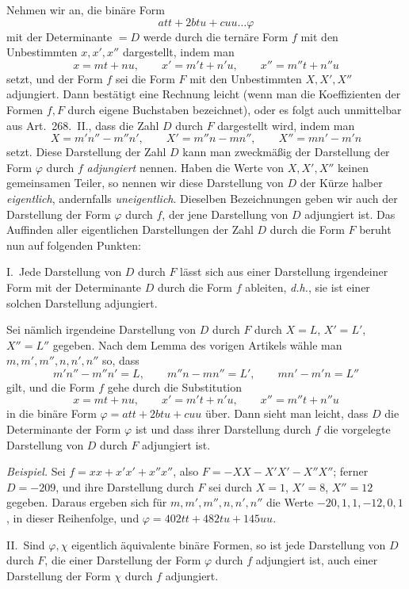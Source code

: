 Nehmen wir an, die binäre Form
\[
att+2btu+cuu\ldots\varphi
\]
mit der Determinante $=D$ werde durch die ternäre Form $f$ mit den
Unbestimmten $x,x',x''$ dargestellt, indem man
\[
x=mt+nu,\qquad x'=m't+n'u,\qquad x''=m''t+n''u
\]
setzt, und der Form $f$ sei die Form $F$ mit den Unbestimmten $X,X',X''$
adjungiert. Dann bestätigt eine Rechnung leicht (wenn man die Koeffizienten
der Formen $f,F$ durch eigene Buchstaben bezeichnet), oder es folgt auch
unmittelbar aus Art.\ 268.\ II., dass die Zahl $D$ durch $F$
dargestellt wird, indem man
\[
X=m'n''-m''n',\qquad X'=m''n-mn'',\qquad X''=mn'-m'n
\]
setzt. Diese Darstellung der Zahl $D$ kann man zweckmäßig der Darstellung
der Form $\varphi$ durch $f$ \textit{adjungiert} nennen. Haben die Werte
von $X,X',X''$ keinen gemeinsamen Teiler, so nennen wir diese Darstellung
von $D$ der Kürze halber \textit{eigentlich}, andernfalls \textit{uneigentlich}.
Dieselben Bezeichnungen geben wir auch der Darstellung der Form $\varphi$
durch $f$, der jene Darstellung von $D$ adjungiert ist. Das Auffinden
aller eigentlichen Darstellungen der Zahl $D$ durch die Form $F$
beruht nun auf folgenden Punkten:

I.\ Jede Darstellung von $D$ durch $F$ lässt sich aus einer
Darstellung irgendeiner Form mit der Determinante $D$ durch die Form
$f$ ableiten, \textit{d.h.}, sie ist einer solchen Darstellung adjungiert.

Sei nämlich irgendeine Darstellung von $D$ durch $F$ durch $X=L$,
$X'=L'$, $X''=L''$ gegeben. Nach dem Lemma des vorigen Artikels wähle man
$m,m',m'',n,n',n''$ so, dass
\[
m'n''-m''n'=L,\qquad m''n-mn''=L',\qquad mn'-m'n=L''
\]
gilt, und die Form $f$ gehe durch die Substitution
\[
x=mt+nu,\qquad x'=m't+n'u,\qquad x''=m''t+n''u
\]
in die binäre Form $\varphi=att+2btu+cuu$ über. Dann sieht man leicht, dass $D$ die
Determinante der Form $\varphi$ ist und dass ihrer Darstellung durch $f$
die vorgelegte Darstellung von $D$ durch $F$ adjungiert ist.

\textit{Beispiel.} Sei $f=xx+x'x'+x''x''$, also $F=-XX-X'X'-X''X''$;
ferner $D=-209$, und ihre Darstellung durch $F$ sei durch $X=1$, $X'=8$, $X''=12$ gegeben.
Daraus ergeben sich für $m,m',m'',n,n',n''$ die Werte $-20,1,1,-12,0,1$, in dieser Reihenfolge,
und $\varphi=402tt+482tu+145uu$.

II.\ Sind $\varphi,\chi$ eigentlich äquivalente binäre Formen, so ist jede
Darstellung von $D$ durch $F$, die einer Darstellung der Form
$\varphi$ durch $f$ adjungiert ist, auch einer Darstellung der Form
$\chi$ durch $f$ adjungiert.

